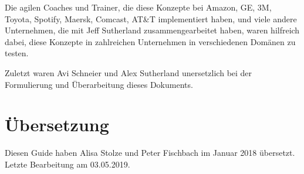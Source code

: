 \documentclass[12pt,a4paper,parskip=full]{scrartcl}
\begin{document}
Die agilen Coaches und Trainer, die diese Konzepte bei Amazon, GE, 3M, Toyota,
Spotify, Maersk, Comcast, AT&T implementiert haben, und viele andere Unternehmen,
die mit Jeff Sutherland zusammengearbeitet haben, waren hilfreich dabei, diese
Konzepte in zahlreichen Unternehmen in verschiedenen Domänen zu testen.

Zuletzt waren Avi Schneier und Alex Sutherland unersetzlich bei der Formulierung
und Überarbeitung dieses Dokuments.

\pagebreak

\printbibliography

\section{Übersetzung}
Diesen Guide haben Alisa Stolze und Peter Fischbach im Januar 2018 übersetzt.
Letzte Bearbeitung am 03.05.2019. 
\end{document}
